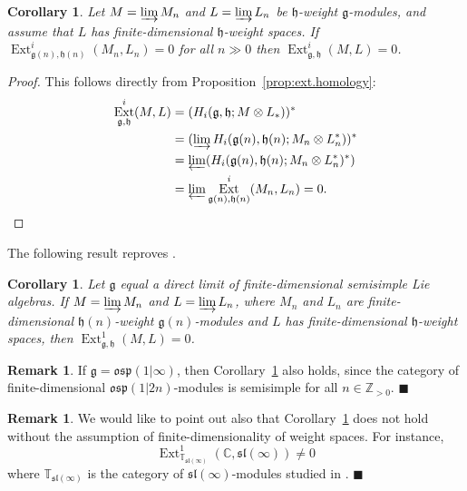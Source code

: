 \documentclass[12pt]{amsart}
\newcommand\C{\mathbb{C}}
\newcommand\Z{\mathbb{Z}}
\newcommand\g{\mathfrak{g}}
\newcommand\fh{\mathfrak{h}}
\newcommand\fsl{\mathfrak{sl}}
\newcommand\fosp{\mathfrak{osp}}
\DeclareMathOperator{\Ext}{Ext}
\theoremstyle{plain}
\newtheorem{cor}[theo]{Corollary}
\theoremstyle{definition}
\newtheorem{rem}[theo]{Remark}
\numberwithin{equation}{section}
\newcommand\xqed[1]{%
  \leavevmode\unskip\penalty9999 \hbox{}\nobreak\hfill
  \quad\hbox{#1}}
\newcommand\demo{\xqed{$\blacksquare$}}
\begin{document}
\begin{cor}\label{prop:local.triv.ext=global}
Let $M = \varinjlim M_n$ and $L = \varinjlim L_n$ be $\fh$-weight $\g$-modules, and assume that $L$ has finite-dimensional $\fh$-weight spaces. If $\Ext_{\g(n), \fh(n)}^i(M_n, L_n) = 0$ for all $n\gg 0$ then $\Ext_{\g, \fh}^i(M, L) = 0$.
\end{cor}
\begin{proof}
This follows directly from Proposition~\ref{prop:ext.homology}:
\begin{align*}
\Ext_{\g, \fh}^i(M, L)  & = (H_i(\g, \fh; M\otimes L_*))^*  \\
& =  (\varinjlim H_i(\g(n), \fh(n); M_n\otimes L_n^*))^* \\
& = \varprojlim (H_i(\g(n), \fh(n); M_n\otimes L_n^*)^*) \\
& =\varprojlim \Ext_{\g(n), \fh(n)}^i(M_n, L_n)=0. \qedhere
\end{align*}
\end{proof}

The following result reproves \cite[Theorem~3.7]{PS11}.

\begin{cor}\label{cor:local.triv.ext=global.lie.algebra}
Let $\g$ equal a direct limit of finite-dimensional semisimple Lie algebras. If $M = \varinjlim M_n$ and $L = \varinjlim L_n$, where $M_n$ and $L_n$ are finite-dimensional $\fh(n)$-weight $\g(n)$-modules and $L$ has finite-dimensional $\fh$-weight spaces, then $\Ext_{\g, \fh}^1(M, L) = 0$.
\end{cor}

\begin{rem}
If $\g = \fosp(1|\infty)$, then Corollary~\ref{cor:local.triv.ext=global.lie.algebra} also holds, since the category of finite-dimensional $\fosp(1|2n)$-modules is semisimple for all $n\in \Z_{>0}$.
\demo
\end{rem}

\begin{rem}
We would like to point out also that Corollary~\ref{prop:local.triv.ext=global} does not hold without the assumption of finite-dimensionality of weight spaces. For instance, 
	\[
\Ext_{\mathbb{T}_{\fsl(\infty)}}^1(\C, \fsl(\infty))\neq 0
	\]
where $\mathbb{T}_{\fsl(\infty)}$ is the category of $\fsl(\infty)$-modules studied in \cite{PS11, D-CPS16, PSty11}.
\demo
\end{rem}




\end{document}

